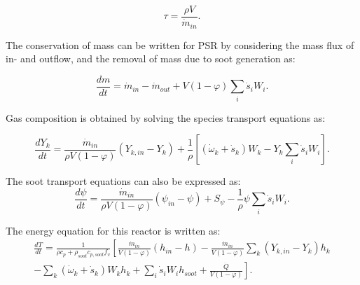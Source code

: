 \begin{equation}
	\tau = \frac{\rho V}{\dot{m}_{in}}
	\label{eqn:taupsr}.
\end{equation} 

 


The conservation of mass can be written for PSR by considering the mass flux of in- and outflow, and the removal of mass due to soot generation as:

\begin{equation}
	\frac{d m}{d t}
	=
	\dot{m}_{in} - \dot{m}_{out} 
	+ V(1 - \varphi)\sum_i \dot{s}_i W_i 
	\label{eqn:contpsr}.
\end{equation}

Gas composition is obtained by solving the species transport equations as:

\begin{equation}
	\frac{d Y_k}{d t}
	=
	\frac{{\dot{m}}_{in}}{\rho V
	\left(1-\varphi\right)}
	\left(Y_{k,in}-Y_k \right)+
	\frac{1}{\rho}\left[\left(\dot{\omega}_k+\dot{s}_k\right) W_k-Y_k \sum_i \dot{s}_i W_i\right]
	\label{eqn:speciespsr}.
\end{equation}

The soot transport equations can also be expressed as:
\begin{equation}
	\frac{d\psi}{dt}
	=
	\frac{{\dot{m}}_{in}}{\rho V
		\left(1-\varphi\right)}
	\left(\psi_{in}-\psi\right)
	+
	S_{\psi}
	-\frac{1}{\rho}\psi\sum_{i}{{\dot{s}}_i W_i}
	\label{eqn:sootpsr}.
\end{equation}

The energy equation for this reactor is written as:
\begin{equation}
	\begin{split}
		\frac{dT}{dt}
		=
		\frac{1}
		{
			\rho c_p+\rho_{soot}c_{p,soot}f_v
		}
		\left[
		\frac{{\dot{m}}_{in}}{V(1 - \varphi)}
		\left(h_{in}-h\right)
		-
		\frac{{\dot{m}}_{in}}{V (1 - \varphi)}\sum_{k}\left(Y_{k,in}-Y_k\right)h_k
		\right.\\
		\left.	
		-
		\sum_{k}{
			\left(
			{\dot{\omega}}_k
			+
			{\dot{s}}_k
			\right) W_k h_k}
		+\sum_{i}{{\dot{s}}_i W_i} h_{soot}+\frac{\dot{Q}}{V(1 - \varphi)}
		\right].
	\end{split}
		\label{eqn:energypsr}
\end{equation}



